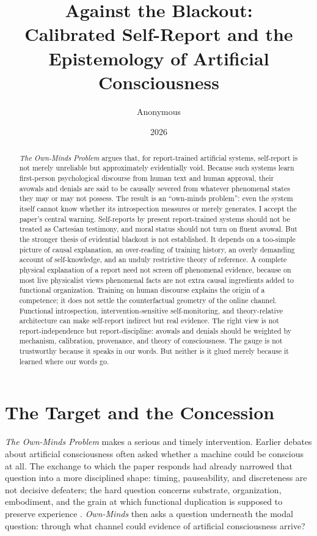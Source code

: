 \documentclass[11pt]{article}
\title{Against the Blackout:\\ Calibrated Self-Report and the Epistemology of Artificial Consciousness}
\author{Anonymous}
\date{2026}
\begin{document}
\maketitle

\begin{abstract}
\noindent \textit{The Own-Minds Problem} argues that, for report-trained artificial systems, self-report is not merely unreliable but approximately evidentially void. Because such systems learn first-person psychological discourse from human text and human approval, their avowals and denials are said to be causally severed from whatever phenomenal states they may or may not possess. The result is an ``own-minds problem'': even the system itself cannot know whether its introspection measures or merely generates. I accept the paper's central warning. Self-reports by present report-trained systems should not be treated as Cartesian testimony, and moral status should not turn on fluent avowal. But the stronger thesis of evidential blackout is not established. It depends on a too-simple picture of causal explanation, an over-reading of training history, an overly demanding account of self-knowledge, and an unduly restrictive theory of reference. A complete physical explanation of a report need not screen off phenomenal evidence, because on most live physicalist views phenomenal facts are not extra causal ingredients added to functional organization. Training on human discourse explains the origin of a competence; it does not settle the counterfactual geometry of the online channel. Functional introspection, intervention-sensitive self-monitoring, and theory-relative architecture can make self-report indirect but real evidence. The right view is not report-independence but report-discipline: avowals and denials should be weighted by mechanism, calibration, provenance, and theory of consciousness. The gauge is not trustworthy because it speaks in our words. But neither is it glued merely because it learned where our words go.
\end{abstract}

\section{The Target and the Concession}

\textit{The Own-Minds Problem} makes a serious and timely intervention. Earlier debates about artificial consciousness often asked whether a machine could be conscious at all. The exchange to which the paper responds had already narrowed that question into a more disciplined shape: timing, pauseability, and discreteness are not decisive defeaters; the hard question concerns substrate, organization, embodiment, and the grain at which functional duplication is supposed to preserve experience \citep{intermittent,patterns}. \textit{Own-Minds} then asks a question underneath the modal question: through what channel could evidence of artificial consciousness arrive?
\end{document}
